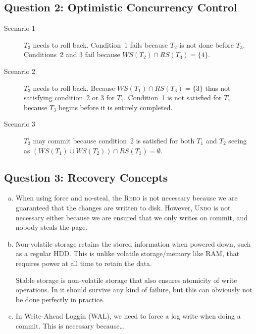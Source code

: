 \documentclass[a4paper]{article}
\begin{document}
\subsection{Question 2: Optimistic Concurrency Control}

\begin{description}
    \item[Scenario 1] $T_3$ needs to roll back. Condition~1 fails because $T_2$
        is not done before $T_3$. Conditions~2 and 3 fail because $WS(T_2) \cap
        RS(T_3) = \{4\}$.
    \item[Scenario 2] $T_3$ needs to roll back. Because $WS(T_1) \cap RS(T_3) =
        \{3\}$ thus not satisfying condition~2 or 3 for $T_1$. Condition~1 is
        not satisfied for $T_1$ because $T_3$ begins before it is entirely
        completed.
    \item[Scenario 3] $T_3$ may commit because condition~2 is satisfied for
        both $T_1$ and $T_2$ seeing as $(WS(T_1) \cup WS(T_2)) \cap RS(T_3) =
        \emptyset$.
\end{description}

\subsection{Question 3: Recovery Concepts}

\begin{enumerate}[(a)]
    \item When using force and no-steal, the \textsc{Redo} is not necessary
        because we are guaranteed that the changes are written to disk.
        However, \textsc{Undo} is not necessary either because we are ensured
        that we only writes on commit, and nobody steals the page.
    \item Non-volatile storage retains the stored information when powered
        down, such as a regular HDD\@. This is unlike volatile storage/memory
        like RAM, that requires power at all time to retain the data.

        Stable storage is non-volatile storage that also ensures atomicity of
        write operations. In it should survive any kind of failure, but this
        can obviously not be done perfectly in practice.
    \item In Write-Ahead Loggin (WAL), we need to force a log write when doing
        a commit. This is necessary because\ldots %
\end{enumerate}
\end{document}
